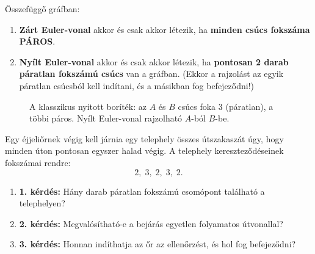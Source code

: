 \documentclass[a4paper,12pt]{article}
\begin{document}
\begin{teteldoboz}
Összefüggő gráfban:
\begin{enumerate}
    \item \textbf{Zárt Euler-vonal} akkor és csak akkor létezik, ha \textbf{minden csúcs fokszáma PÁROS}.
    \item \textbf{Nyílt Euler-vonal} akkor és csak akkor létezik, ha \textbf{pontosan 2 darab páratlan fokszámú csúcs} van a gráfban. (Ekkor a rajzolást az egyik páratlan csúcsból kell indítani, és a másikban fog befejeződni!)
\end{enumerate}
\end{teteldoboz}

\begin{figure}[H]
    \centering
    \caption{A klasszikus nyitott boríték: az $A$ és $B$ csúcs foka 3 (páratlan), a többi páros. Nyílt Euler-vonal rajzolható $A$-ból $B$-be.}
\end{figure}

\begin{feladatdoboz}
Egy éjjeliőrnek végig kell járnia egy telephely összes útszakaszát úgy, hogy minden úton pontosan egyszer halad végig. A telephely kereszteződéseinek fokszámai rendre:
\[
    2,\; 3,\; 2,\; 3,\; 2.
\]
\begin{enumerate}[label=\alph*)]
    \item \textbf{1. kérdés:} Hány darab páratlan fokszámú csomópont található a telephelyen?
    \item \textbf{2. kérdés:} Megvalósítható-e a bejárás egyetlen folyamatos útvonallal?
    \item \textbf{3. kérdés:} Honnan indíthatja az őr az ellenőrzést, és hol fog befejeződni?
\end{enumerate}
\end{feladatdoboz}
\end{document}
